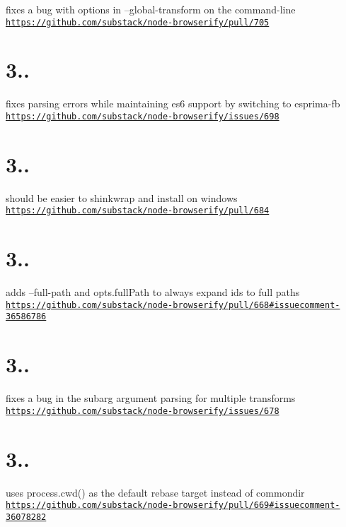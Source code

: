 fixes a bug with options in --global-\/transform on the command-\/line \href{https://github.com/substack/node-browserify/pull/705}{\tt https\+://github.\+com/substack/node-\/browserify/pull/705}

\section*{3..}

fixes parsing errors while maintaining es6 support by switching to esprima-\/fb \href{https://github.com/substack/node-browserify/issues/698}{\tt https\+://github.\+com/substack/node-\/browserify/issues/698}

\section*{3..}

should be easier to shinkwrap and install on windows \href{https://github.com/substack/node-browserify/pull/684}{\tt https\+://github.\+com/substack/node-\/browserify/pull/684}

\section*{3..}

adds --full-\/path and opts.\+full\+Path to always expand ids to full paths \href{https://github.com/substack/node-browserify/pull/668#issuecomment-36586786}{\tt https\+://github.\+com/substack/node-\/browserify/pull/668\#issuecomment-\/36586786}

\section*{3..}

fixes a bug in the subarg argument parsing for multiple transforms \href{https://github.com/substack/node-browserify/issues/678}{\tt https\+://github.\+com/substack/node-\/browserify/issues/678}

\section*{3..}

uses process.\+cwd() as the default rebase target instead of commondir \href{https://github.com/substack/node-browserify/pull/669#issuecomment-36078282}{\tt https\+://github.\+com/substack/node-\/browserify/pull/669\#issuecomment-\/36078282}

